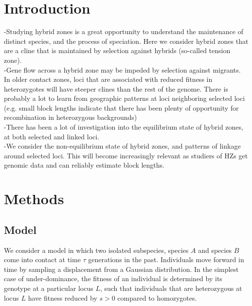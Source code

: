 \documentclass[12pt]{amsart}
\title{}
\author{}
\date{} %
\begin{document}
\maketitle

\section{Introduction}
-Studying hybrid zones is a great opportunity to understand the maintenance of distinct species, and the process of speciation. Here we consider hybrid zones that are a cline that is maintained by selection against hybrids (so-called tension zone). \\
-Gene flow across a hybrid zone may be impeded by selection against migrants. In older contact zones, loci that are associated with reduced fitness in heterozygotes will have steeper clines than the rest of the genome. There is probably a lot to learn from geographic patterns at loci neighboring selected loci (e.g. small block lengths indicate that there has been plenty of opportunity for recombination in heterozygous backgrounds)\\ 
-There has been a lot of investigation into the equilibrium state of hybrid zones, at both selected and linked loci. \\
-We consider the non-equilibrium state of hybrid zones, and patterns of linkage around selected loci. This will become increasingly relevant as studiers of HZs get genomic data and can reliably estimate block lengths. \\

	
\section{Methods}
\subsection{Model}
We consider a model in which two isolated subspecies, species $A$ and species $B$ come into contact at time $\tau$ generations in the past. Individuals move forward in time by sampling a displacement from a Gaussian distribution. In the simplest case of under-dominance, the fitness of an individual is determined by its genotype at a particular locus $L$, such that individuals that are heterozygous at locus $L$ have fitness reduced by $s>0$ compared to homozygotes.\\
\end{document}
